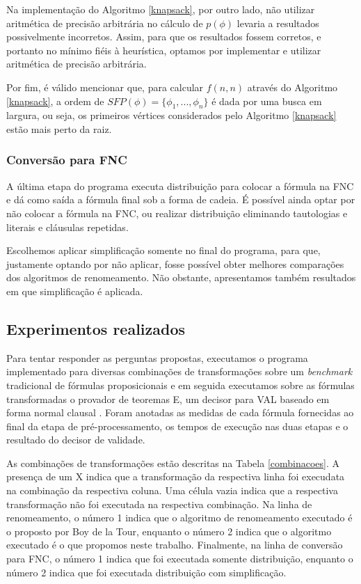Na implementação do Algoritmo \ref{knapsack}, por outro lado, não utilizar aritmética de precisão arbitrária no cálculo de $p(\phi)$ levaria a resultados possivelmente incorretos. Assim, para que os resultados fossem corretos, e portanto no mínimo fiéis à heurística, optamos por implementar e utilizar aritmética de precisão arbitrária.

Por fim, é válido mencionar que, para calcular $f(n,n)$ através do Algoritmo \ref{knapsack}, a ordem de $SFP(\phi) = \{\phi_1,...,\phi_n \}$ é dada por uma busca em largura, ou seja, os primeiros vértices considerados pelo Algoritmo \ref{knapsack} estão mais perto da raiz.

\subsubsection{Conversão para FNC}

\indent

A última etapa do programa executa distribuição para colocar a fórmula na FNC e dá como saída a fórmula final sob a forma de cadeia. É possível ainda optar por não colocar a fórmula na FNC, ou realizar distribuição eliminando tautologias e literais e cláusulas repetidas.

Escolhemos aplicar simplificação somente no final do programa, para que, justamente optando por não aplicar, fosse possível obter melhores comparações dos algoritmos de renomeamento. Não obstante, apresentamos também resultados em que simplificação é aplicada.

\subsection{Experimentos realizados}

\indent

Para tentar responder as perguntas propostas, executamos o programa implementado para diversas combinações de transformações sobre um \textit{benchmark} tradicional de fórmulas proposicionais e em seguida executamos sobre as fórmulas transformadas o provador de teoremas E, um decisor para VAL baseado em forma normal clausal \cite{Schulz:LPAR-2013}. Foram anotadas as medidas de cada fórmula fornecidas ao final da etapa de pré-processamento, os tempos de execução nas duas etapas e o resultado do decisor de validade.

As combinações de transformações estão descritas na Tabela \ref{combinacoes}. A presença de um X indica que a transformação da respectiva linha foi execudata na combinação da respectiva coluna. Uma célula vazia indica que a respectiva transformação não foi executada na respectiva combinação. Na linha de renomeamento, o número 1 indica que o algoritmo de renomeamento executado é o proposto por Boy de la Tour, enquanto o número 2 indica que o algoritmo executado é o que propomos neste trabalho. Finalmente, na linha de conversão para FNC, o número 1 indica que foi executada somente distribuição, enquanto o número 2 indica que foi executada distribuição com simplificação.

